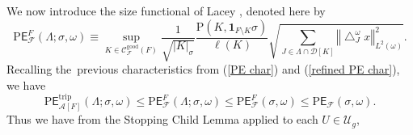 \documentclass{amsart}%
\theoremstyle{plain}
\numberwithin{equation}{section}
\begin{document}
We now introduce the size functional of Lacey \cite{Lac}, denoted here by%
\[
\mathrm{P}\mathsf{E}_{\mathcal{F}}^{F}\left(  \Lambda;\sigma,\omega\right)
\equiv\sup_{K\in\mathcal{C}_{\mathcal{F}}^{\operatorname{good}}\left(
F\right)  }\frac{1}{\sqrt{\left\vert K\right\vert _{\sigma}}}\frac
{\mathrm{P}\left(  K,\mathbf{1}_{F\setminus K}\sigma\right)  }{\ell\left(
K\right)  }\sqrt{\sum_{J\in\Lambda\cap\mathcal{D}\left[  K\right]  }\left\Vert
\bigtriangleup_{J}^{\omega}x\right\Vert _{L^{2}\left(  \omega\right)  }^{2}}.
\]
Recalling the\ previous characteristics from (\ref{PE char}) and
(\ref{refined PE char}), we have%
\begin{equation}
\mathrm{P}\mathsf{E}_{\mathcal{A}\left[  F\right]  }^{\operatorname*{trip}%
}\left(  \Lambda;\sigma,\omega\right)  \leq\mathrm{P}\mathsf{E}_{\mathcal{F}%
}^{F}\left(  \Lambda;\sigma,\omega\right)  \leq\mathrm{P}\mathsf{E}%
_{\mathcal{F}}^{F}\left(  \sigma,\omega\right)  \leq\mathrm{P}\mathsf{E}%
_{\mathcal{F}}\left(  \sigma,\omega\right)  .\label{note}%
\end{equation}
Thus we have from the Stopping Child Lemma applied to each $U\in
\mathcal{U}_{g}$,%
\end{document}
